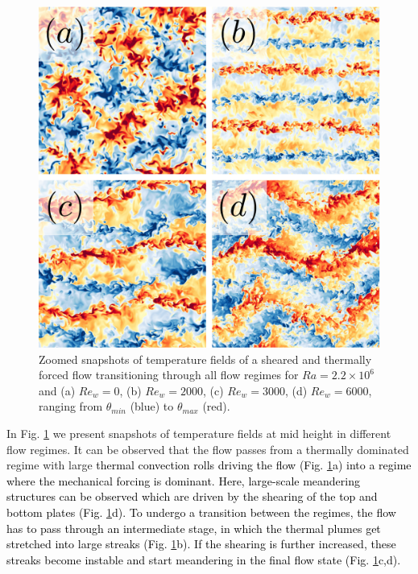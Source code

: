 \documentclass[5p,times]{elsarticle}
\begin{document}

\begin{figure}
	\centering
	\includegraphics[width=0.8\linewidth]{squaredoverview}%
	\caption{\label{fig:overview} Zoomed snapshots of temperature fields
of a sheared and thermally forced flow transitioning through all flow regimes
for $ Ra=2.2 \times 10^6 $ and (a) $ Re_w=0 $, (b) $ Re_w=2000 $, (c) $ Re_w=3000 $, (d) $ Re_w=6000 $, ranging from $ \theta_{min} $ (blue) to $ \theta_{max} $ (red).}
\end{figure}

In Fig. \ref{fig:overview} we present snapshots of temperature
fields at mid height in different flow regimes. It can be observed that the flow passes from a
thermally dominated regime with large \textcolor{black}{thermal convection rolls driving the flow (Fig. \ref{fig:overview}a) into a
regime where the mechanical forcing is dominant. Here, large-scale meandering
structures can be observed which are driven by the shearing of the top and bottom plates (Fig. \ref{fig:overview}d). To undergo a transition between the
regimes, the flow has to pass through an intermediate stage, in which the thermal plumes
get stretched into large streaks (Fig. \ref{fig:overview}b). If the shearing is
further increased, these streaks become instable and start meandering in the
final flow state (Fig. \ref{fig:overview}c,d).}
\end{document}
